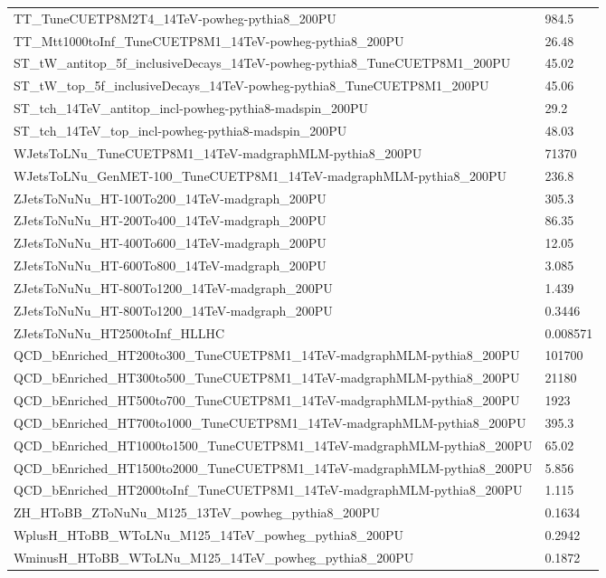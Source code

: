 \begin{table}
\begin{center}
\begin{adjustbox}{width=\textwidth}
\begin{tabular}{|l|l|}
    TT\_TuneCUETP8M2T4\_14TeV-powheg-pythia8\_200PU               & 984.5 \\
TT\_Mtt1000toInf\_TuneCUETP8M1\_14TeV-powheg-pythia8\_200PU                     & 26.48 \\
ST\_tW\_antitop\_5f\_inclusiveDecays\_14TeV-powheg-pythia8\_TuneCUETP8M1\_200PU & 45.02 \\
ST\_tW\_top\_5f\_inclusiveDecays\_14TeV-powheg-pythia8\_TuneCUETP8M1\_200PU     & 45.06 \\
ST\_tch\_14TeV\_antitop\_incl-powheg-pythia8-madspin\_200PU                     & 29.2 \\
ST\_tch\_14TeV\_top\_incl-powheg-pythia8-madspin\_200PU                         & 48.03 \\
WJetsToLNu\_TuneCUETP8M1\_14TeV-madgraphMLM-pythia8\_200PU             & 71370 \\
WJetsToLNu\_GenMET-100\_TuneCUETP8M1\_14TeV-madgraphMLM-pythia8\_200PU & 236.8 \\
ZJetsToNuNu\_HT-100To200\_14TeV-madgraph\_200PU  & 305.3    \\
ZJetsToNuNu\_HT-200To400\_14TeV-madgraph\_200PU  & 86.35    \\
ZJetsToNuNu\_HT-400To600\_14TeV-madgraph\_200PU  & 12.05    \\
ZJetsToNuNu\_HT-600To800\_14TeV-madgraph\_200PU  & 3.085    \\
ZJetsToNuNu\_HT-800To1200\_14TeV-madgraph\_200PU & 1.439    \\
ZJetsToNuNu\_HT-800To1200\_14TeV-madgraph\_200PU & 0.3446   \\
ZJetsToNuNu\_HT2500toInf\_HLLHC                  & 0.008571 \\
QCD\_bEnriched\_HT200to300\_TuneCUETP8M1\_14TeV-madgraphMLM-pythia8\_200PU   & 101700 \\
QCD\_bEnriched\_HT300to500\_TuneCUETP8M1\_14TeV-madgraphMLM-pythia8\_200PU   & 21180  \\
QCD\_bEnriched\_HT500to700\_TuneCUETP8M1\_14TeV-madgraphMLM-pythia8\_200PU   & 1923   \\
QCD\_bEnriched\_HT700to1000\_TuneCUETP8M1\_14TeV-madgraphMLM-pythia8\_200PU  & 395.3  \\
QCD\_bEnriched\_HT1000to1500\_TuneCUETP8M1\_14TeV-madgraphMLM-pythia8\_200PU & 65.02  \\
QCD\_bEnriched\_HT1500to2000\_TuneCUETP8M1\_14TeV-madgraphMLM-pythia8\_200PU & 5.856  \\
QCD\_bEnriched\_HT2000toInf\_TuneCUETP8M1\_14TeV-madgraphMLM-pythia8\_200PU  & 1.115  \\
ZH\_HToBB\_ZToNuNu\_M125\_13TeV\_powheg\_pythia8\_200PU     & 0.1634 \\
WplusH\_HToBB\_WToLNu\_M125\_14TeV\_powheg\_pythia8\_200PU  & 0.2942 \\
WminusH\_HToBB\_WToLNu\_M125\_14TeV\_powheg\_pythia8\_200PU & 0.1872 \\
\hline
    \end{tabular}
    \end{adjustbox}
    \end{center}


\end{table}
